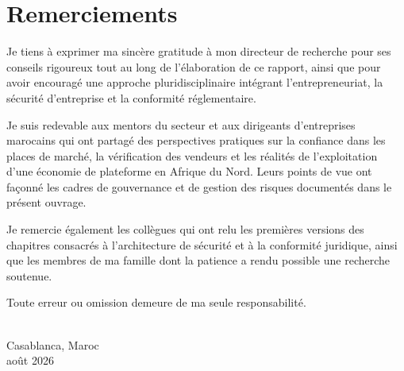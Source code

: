 \chapter*{Remerciements}

Je tiens à exprimer ma sincère gratitude à mon directeur de recherche pour ses conseils rigoureux tout au long de l'élaboration de ce rapport, ainsi que pour avoir encouragé une approche pluridisciplinaire intégrant l'entrepreneuriat, la sécurité d'entreprise et la conformité réglementaire.

Je suis redevable aux mentors du secteur et aux dirigeants d'entreprises marocains qui ont partagé des perspectives pratiques sur la confiance dans les places de marché, la vérification des vendeurs et les réalités de l'exploitation d'une économie de plateforme en Afrique du Nord. Leurs points de vue ont façonné les cadres de gouvernance et de gestion des risques documentés dans le présent ouvrage.

Je remercie également les collègues qui ont relu les premières versions des chapitres consacrés à l'architecture de sécurité et à la conformité juridique, ainsi que les membres de ma famille dont la patience a rendu possible une recherche soutenue.

Toute erreur ou omission demeure de ma seule responsabilité.

\vspace{1.5cm}
\begin{flushright}
\\
Casablanca, Maroc\\
août 2026
\end{flushright}

